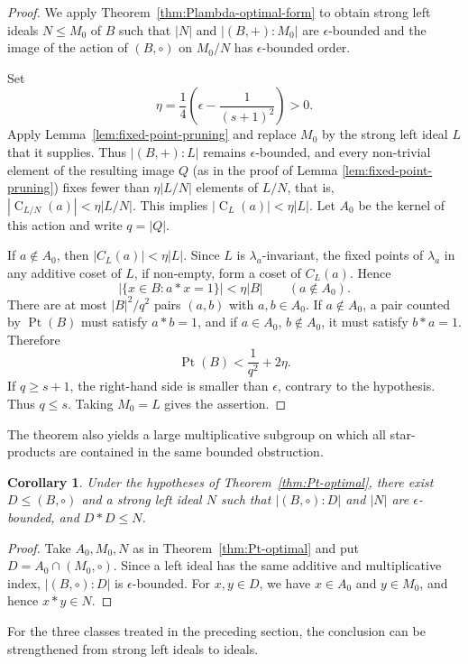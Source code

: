 \documentclass[11pt, oneside]{amsart}
\numberwithin{equation}{section}
\theoremstyle{plain}
\newtheorem{cor}[equation]{Corollary}
\theoremstyle{definition}
\newcommand{\C}{\operatorname{C} }
\newcommand{\Pt}{\operatorname{Pt} }
\begin{document}
\begin{proof}
We apply Theorem~\ref{thm:Plambda-optimal-form} to obtain strong left
ideals $N\leqslant M_0$ of $B$ such that $|N|$ and $|(B,+):M_0|$ are
$\epsilon$-bounded and the image of the action of $(B,\circ)$ on $M_0/N$ has $\epsilon$-bounded order.

Set
$$
\eta=\frac14\left(\epsilon-\frac1{(s+1)^2}\right)>0.
$$
Apply Lemma~\ref{lem:fixed-point-pruning} and replace $M_0$ by the strong left ideal $L$ that it supplies. Thus $|(B,+):L|$ remains $\epsilon$-bounded, and every non-trivial element of the resulting image $Q$ (as in the proof of Lemma \ref{lem:fixed-point-pruning}) fixes fewer than $\eta|L/N|$ elements of $L/N$,  that is, $|\C_{L/N}(a)|<\eta|L/N|$. This implies $|\C_{L}(a)|<\eta|L|$.  Let
$A_0$ be the kernel of this action and write $q=|Q|$.

If $a\notin A_0$, then $|C_{L}(a)|<\eta|L|$. Since $L$ is
$\lambda_a$-invariant, the fixed points of $\lambda_a$ in any additive
coset of $L$, if non-empty, form a coset of $C_{L}(a)$. Hence
$$
|\{x\in B:a*x= 1\}|<\eta|B|
\qquad(a\notin A_0).
$$
There are at most $|B|^2/q^2$ pairs $(a,b)$ with $a,b\in A_0$. If
$a\notin A_0$, a pair counted by $\Pt(B)$ must satisfy $a*b=1$, and if
$a\in A_0$, $b\notin A_0$, it must satisfy $b*a=1$. Therefore
$$
\Pt(B)<\frac1{q^2}+2\eta.
$$
If $q\geqslant s+1$, the right-hand side is smaller than $\epsilon$,
contrary to the hypothesis. Thus $q\leqslant s$. Taking
$M_0=L$ gives the assertion.
\end{proof}

The theorem also yields a large multiplicative subgroup on which all
star-products are contained in the same bounded obstruction.

\begin{cor}
Under the hypotheses of Theorem~\ref{thm:Pt-optimal}, there exist
$D\leqslant(B,\circ)$ and a strong left ideal $N$ such that
$|(B,\circ):D|$ and $|N|$ are $\epsilon$-bounded,
and  $D*D\leqslant N$.
\end{cor}

\begin{proof}
Take $A_0,M_0,N$ as in Theorem~\ref{thm:Pt-optimal} and put
$D=A_0\cap(M_0,\circ)$. Since a left ideal has the same additive and
multiplicative index, $|(B,\circ):D|$ is $\epsilon$-bounded. For
$x,y\in D$, we have $x\in A_0$ and $y\in M_0$, and hence $x*y\in N$.
\end{proof}

For the three classes treated in the preceding section, the conclusion
can be strengthened from strong left ideals to ideals.
\end{document}
